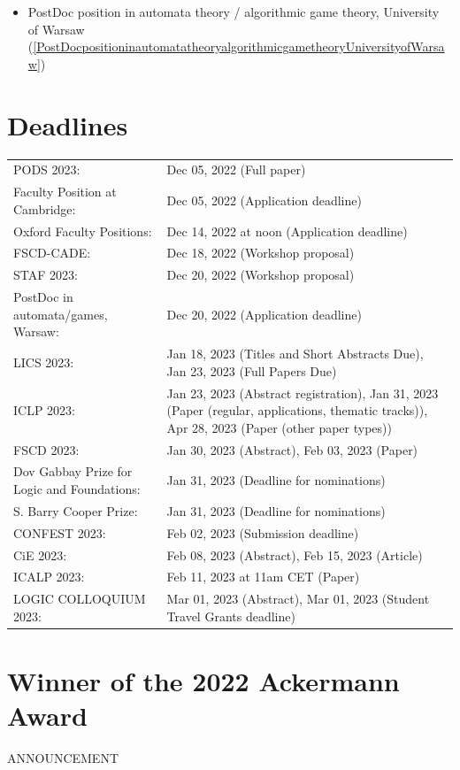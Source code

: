 \documentclass[prodmode,acmtecs]{acmsmall} %
\begin{document}
\begin{itemize}
\begin{itemize}\item PostDoc position in automata theory / algorithmic game theory, University of Warsaw (\cref{PostDocpositioninautomatatheoryalgorithmicgametheoryUniversityofWarsaw})
\end{itemize} 
\end{itemize}\section{Deadlines}\label{deadlines}\begin{tabulary}{\linewidth}{LL}PODS 2023:  & Dec 05, 2022 (Full paper) \\
Faculty Position at Cambridge:  & Dec 05, 2022 (Application deadline) \\
Oxford Faculty Positions:  & Dec 14, 2022 at noon (Application deadline) \\
FSCD-CADE:  & Dec 18, 2022 (Workshop proposal) \\
STAF 2023:  & Dec 20, 2022 (Workshop proposal) \\
PostDoc in automata/games, Warsaw:  & Dec 20, 2022 (Application deadline) \\
LICS 2023:  & Jan 18, 2023 (Titles and Short Abstracts Due), Jan 23, 2023 (Full Papers Due) \\
ICLP 2023:  & Jan 23, 2023 (Abstract registration), Jan 31, 2023 (Paper  (regular, applications, thematic tracks)), Apr 28, 2023 (Paper  (other paper types)) \\
FSCD 2023:  & Jan 30, 2023 (Abstract), Feb 03, 2023 (Paper) \\
Dov Gabbay Prize for Logic and Foundations:  & Jan 31, 2023 (Deadline for nominations) \\
S. Barry Cooper Prize:  & Jan 31, 2023 (Deadline for nominations) \\
CONFEST 2023:  & Feb 02, 2023 (Submission deadline) \\
CiE 2023:  & Feb 08, 2023 (Abstract), Feb 15, 2023 (Article) \\
ICALP 2023:  & Feb 11, 2023 at 11am CET (Paper) \\
LOGIC COLLOQUIUM 2023:  & Mar 01, 2023 (Abstract), Mar 01, 2023 (Student Travel Grants deadline) \\
\end{tabulary}
\section{Winner of the 2022 Ackermann Award}\label{Winnerofthe2022AckermannAward}ANNOUNCEMENT 
\end{document}
